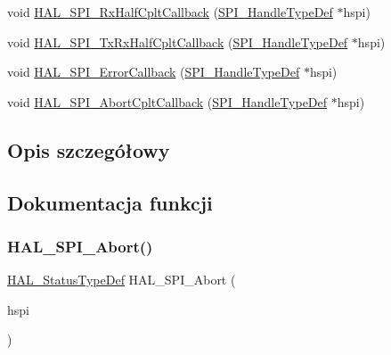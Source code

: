 \begin{DoxyCompactItemize}
\item 
void \hyperlink{group___s_p_i___exported___functions___group2_gacf622756a3814edfacf449b5749b048a}{H\+A\+L\+\_\+\+S\+P\+I\+\_\+\+Rx\+Half\+Cplt\+Callback} (\hyperlink{group___s_p_i___exported___types_gab3bd115785297692c125528b7293566b}{S\+P\+I\+\_\+\+Handle\+Type\+Def} $\ast$hspi)
\item 
void \hyperlink{group___s_p_i___exported___functions___group2_gab46e2325b0880d5b5a301792438b151b}{H\+A\+L\+\_\+\+S\+P\+I\+\_\+\+Tx\+Rx\+Half\+Cplt\+Callback} (\hyperlink{group___s_p_i___exported___types_gab3bd115785297692c125528b7293566b}{S\+P\+I\+\_\+\+Handle\+Type\+Def} $\ast$hspi)
\item 
void \hyperlink{group___s_p_i___exported___functions___group2_ga3db7835e7e7ac335887f62fedf156926}{H\+A\+L\+\_\+\+S\+P\+I\+\_\+\+Error\+Callback} (\hyperlink{group___s_p_i___exported___types_gab3bd115785297692c125528b7293566b}{S\+P\+I\+\_\+\+Handle\+Type\+Def} $\ast$hspi)
\item 
void \hyperlink{group___s_p_i___exported___functions___group2_ga4a2593ec36fa4def11929e65f631f3cf}{H\+A\+L\+\_\+\+S\+P\+I\+\_\+\+Abort\+Cplt\+Callback} (\hyperlink{group___s_p_i___exported___types_gab3bd115785297692c125528b7293566b}{S\+P\+I\+\_\+\+Handle\+Type\+Def} $\ast$hspi)
\end{DoxyCompactItemize}


\subsection{Opis szczegółowy}


\subsection{Dokumentacja funkcji}
\mbox{\label{group___s_p_i___exported___functions___group2_ga11c74b1d91d88ff336f674f6376cc904}} 
\subsubsection{\texorpdfstring{H\+A\+L\+\_\+\+S\+P\+I\+\_\+\+Abort()}{HAL\_SPI\_Abort()}}
{\footnotesize\ttfamily \hyperlink{stm32f4xx__hal__def_8h_a63c0679d1cb8b8c684fbb0632743478f}{H\+A\+L\+\_\+\+Status\+Type\+Def} H\+A\+L\+\_\+\+S\+P\+I\+\_\+\+Abort (\begin{DoxyParamCaption}\item[{\hyperlink{group___s_p_i___exported___types_gab3bd115785297692c125528b7293566b}{S\+P\+I\+\_\+\+Handle\+Type\+Def} $\ast$}]{hspi }\end{DoxyParamCaption})}

